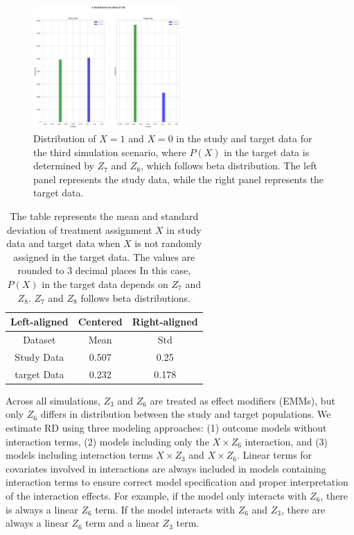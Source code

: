\documentclass[12pt,oneside]{amsart}
\theoremstyle{definition}
\theoremstyle{remark}
\numberwithin{equation}{section}
\begin{document}
\begin{figure}[!h]
    \centering
    \includegraphics[width=0.5\textwidth]{Report/Figure/xnorandom2.jpg}
    \caption{Distribution of $X=1$ and $X=0$ in the study and target data for the third simulation scenario, where $P(X)$ in the target data is determined by $Z_7$ and $Z_8$, which follows beta distribution. The left panel represents the study data, while the right panel represents the target data.}
    \label{fig:xnorandom2}
\end{figure}

\begin{table}[!h]
\centering

\tiny
\begin{tabular}{|c|c|c|}
    \toprule
    Left-aligned & Centered & Right-aligned \\ 
    \midrule
    Dataset & Mean & Std \\ 
    Study Data & 0.507 & 0.25 \\ 
    target Data & 0.232 & 0.178 \\ 
    \bottomrule
\end{tabular}
\caption{The table represents the mean and standard deviation of treatment assignment $X$ in study data and target data when $X$ is not randomly assigned in the target data. The values are rounded to $3$ decimal places In this case, $P(X)$ in the target data depends on $Z_7$ and $Z_8$. $Z_7$ and $Z_8$ follows beta distributions.}
\label{tab:x_z7z8_be}
\end{table}


Across all simulations, $Z_3$ and $Z_6$ are treated as effect modifiers (EMMs), but only $Z_6$ differs in distribution between the study and target populations. We estimate RD using three modeling approaches: (1) outcome models without interaction terms, (2) models including only the $X \times Z_6$ interaction, and (3) models including interaction terms $X \times Z_3$ and $X \times Z_6$. Linear terms for covariates involved in interactions are always included in models containing interaction terms to ensure correct model specification and proper interpretation of the interaction effects. For example, if the model only interacts with $Z_6$, there is always a linear $Z_6$ term. If the model interacts with $Z_6$ and $Z_3$, there are always a linear $Z_6$ term and a linear $Z_3$ term. 
\end{document}

